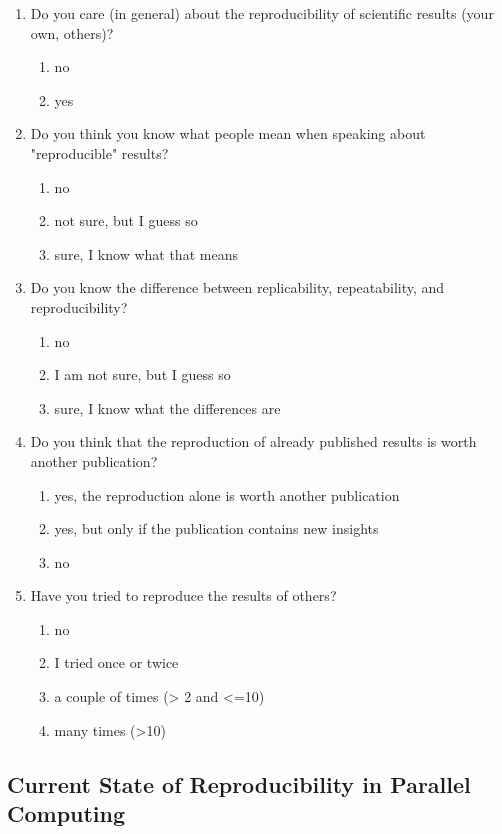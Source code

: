 \documentclass{article}\usepackage[]{graphicx}\usepackage[]{color}
\begin{document}
\begin{enumerate}
\item Do you care (in general) about the reproducibility of scientific
results (your own, others)?
\begin{enumerate}
\item no
\item yes
\end{enumerate}

\item Do you think you know what people mean when speaking about
"reproducible" results?
\begin{enumerate}
\item no
\item not sure, but I guess so
\item sure, I know what that means
\end{enumerate}

\item Do you know the difference between replicability, repeatability, and
reproducibility?
\begin{enumerate}
\item no
\item I am not sure, but I guess so
\item sure, I know what the differences are
\end{enumerate}

\item Do you think that the reproduction of already published results is
worth another publication?
\begin{enumerate}
\item yes, the reproduction alone is worth another publication
\item yes, but only if the publication contains new insights
\item no
\end{enumerate}

\item Have you tried to reproduce the results of others?
\begin{enumerate}
\item no
\item I tried once or twice
\item a couple of times (> 2 and <=10)
\item many times (>10)
\end{enumerate}
\end{enumerate}

\subsection{Current State of Reproducibility in Parallel Computing}
\label{sec-2}
\end{document}
